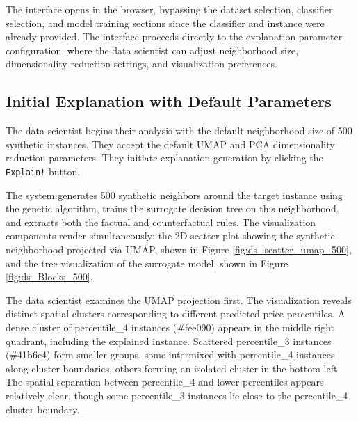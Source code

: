 The interface opens in the browser, bypassing the dataset selection, classifier selection, and model training sections since the classifier and instance were already provided. The interface proceeds directly to the explanation parameter configuration, where the data scientist can adjust neighborhood size, dimensionality reduction settings, and visualization preferences.

\subsection{Initial Explanation with Default Parameters}

The data scientist begins their analysis with the default neighborhood size of 500 synthetic instances. They accept the default UMAP and PCA dimensionality reduction parameters. They initiate explanation generation by clicking the \texttt{Explain!} button.

The system generates 500 synthetic neighbors around the target instance using the genetic algorithm, trains the surrogate decision tree on this neighborhood, and extracts both the factual and counterfactual rules. The visualization components render simultaneously: the 2D scatter plot showing the synthetic neighborhood projected via UMAP, shown in Figure \ref{fig:ds_scatter_umap_500}, and the tree visualization of the surrogate model, shown in Figure \ref{fig:ds_Blocks_500}.

The data scientist examines the UMAP projection first. The visualization reveals distinct spatial clusters corresponding to different predicted price percentiles. A dense cluster of percentile\_4 instances (\#fee090) appears in the middle right quadrant, including the explained instance. Scattered percentile\_3 instances (\#41b6c4) form smaller groups, some intermixed with percentile\_4 instances along cluster boundaries, others forming an isolated cluster in the bottom left. The spatial separation between percentile\_4 and lower percentiles appears relatively clear, though some percentile\_3 instances lie close to the percentile\_4 cluster boundary.

